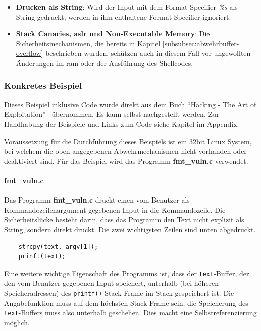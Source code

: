 \documentclass[11pt, a4paper]{article}
\begin{document}
\begin{itemize}
	\item \textbf{Drucken als String}: Wird der Input mit dem Format Specifier \textit{\%s} als String gedruckt, werden in ihm enthaltene Format Specifier ignoriert. 
	\item \textbf{Stack Canaries, \gls{aslr} und Non-Executable Memory}: Die Sicherheitsmechanismen, die bereits in Kapitel \ref{subsubsec:abwehrbuffer-overflow} beschrieben wurden, schützen auch in diesem Fall vor ungewollten Änderungen im \gls{ram} oder der Ausführung des Shellcodes.
\end{itemize} 

\subsubsection{Konkretes Beispiel}\label{subsubsec:bspprintf}
Dieses Beispiel inklusive Code wurde direkt aus dem Buch ``Hacking - The Art of Exploitation''~\cite{erickson2008hacking} übernommen. Es kann selbst nachgestellt werden. Zur Handhabung der Beispiele und Links zum Code siehe Kapitel  im Appendix.

Voraussetzung für die Durchführung dieses Beispiels ist ein 32bit Linux System, bei welchem die oben angegebenen Abwehrmechanismen nicht vorhanden oder deaktiviert sind. Für das Beispiel wird das Programm \textbf{fmt\_vuln.c} verwendet. 

\paragraph{fmt\_vuln.c}
Das Programm \textbf{fmt\_vuln.c} druckt einen vom Benutzer als Kommandozeilenargument gegebenen Input in die Kommandozeile. Die Sicherheitslücke besteht darin, dass das Programm den Text nicht explizit als String, sondern direkt druckt. Die zwei wichtigsten Zeilen sind unten abgedruckt.

\begin{lstlisting}
	strcpy(text, argv[1]);
	prinft(text);
\end{lstlisting} 
Eine weitere wichtige Eigenschaft des Programms ist, dass der \texttt{text}-Buffer, der den vom Benutzer gegebenen Input speichert, unterhalb (bei höheren Speicheradressen) des \texttt{printf()}-Stack Frame im Stack gespeichert ist. Die Angabefunktion muss auf dem höchsten Stack Frame sein, die Speicherung des \texttt{text}-Buffers muss also unterhalb geschehen. Dies macht eine Selbstreferenzierung möglich.
\end{document}
